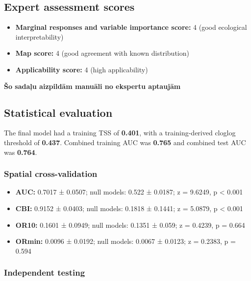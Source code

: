 \documentclass[
  openany]{book}
\providecommand{\tightlist}{%
  \setlength{\itemsep}{0pt}\setlength{\parskip}{0pt}}
\providecommand{\tightlist}{%
  \setlength{\itemsep}{0pt}%
  \setlength{\parskip}{0pt}%
}
\begin{document}
\subsection*{Expert assessment scores}\label{expert-assessment-scores-28}

\begin{itemize}
\tightlist
\item
  \textbf{Marginal responses and variable importance score:} 4 (good ecological interpretability)
\item
  \textbf{Map score:} 4 (good agreement with known distribution)
\item
  \textbf{Applicability score:} 4 (high applicability)
\end{itemize}

\textbf{Šo sadaļu aizpildām manuāli no ekspertu aptaujām}

\subsection*{Statistical evaluation}\label{statistical-evaluation-28}

The final model had a training TSS of \textbf{0.401}, with a training-derived cloglog threshold of \textbf{0.437}. Combined training AUC was \textbf{0.765} and combined test AUC was \textbf{0.764}.

\subsubsection*{Spatial cross-validation}\label{spatial-cross-validation-28}

\begin{itemize}
\tightlist
\item
  \textbf{AUC:} 0.7017 ± 0.0507; null models: 0.522 ± 0.0187; z = 9.6249, p \textless{} 0.001
\item
  \textbf{CBI:} 0.9152 ± 0.0403; null models: 0.1818 ± 0.1441; z = 5.0879, p \textless{} 0.001
\item
  \textbf{OR10:} 0.1601 ± 0.0949; null models: 0.1351 ± 0.059; z = 0.4239, p = 0.664
\item
  \textbf{ORmin:} 0.0096 ± 0.0192; null models: 0.0067 ± 0.0123; z = 0.2383, p = 0.594
\end{itemize}

\subsubsection*{Independent testing}\label{independent-testing-27}
\end{document}
